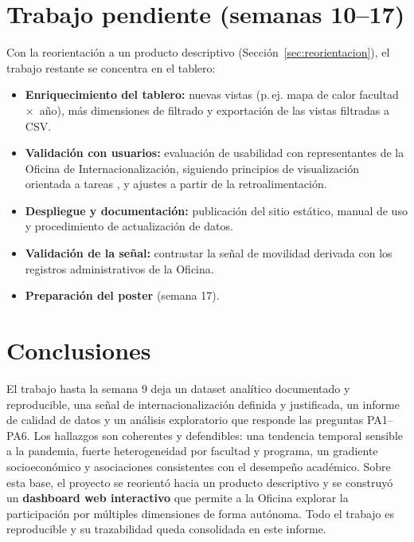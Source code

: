 \documentclass[12pt,a4paper]{article}
\begin{document}
\section{Trabajo pendiente (semanas 10--17)}
Con la reorientación a un producto descriptivo
(Sección~\ref{sec:reorientacion}), el trabajo restante se concentra en el tablero:

\begin{itemize}[leftmargin=*]
    \item \textbf{Enriquecimiento del tablero:} nuevas vistas (p.\,ej. mapa de
    calor facultad~$\times$~año), más dimensiones de filtrado y exportación de las
    vistas filtradas a CSV.
    \item \textbf{Validación con usuarios:} evaluación de usabilidad con
    representantes de la Oficina de Internacionalización, siguiendo principios de
    visualización orientada a tareas \cite{shneiderman1996,munzner2014}, y ajustes
    a partir de la retroalimentación.
    \item \textbf{Despliegue y documentación:} publicación del sitio estático,
    manual de uso y procedimiento de actualización de datos.
    \item \textbf{Validación de la señal:} contrastar la señal de movilidad
    derivada con los registros administrativos de la Oficina.
    \item \textbf{Preparación del poster} (semana 17).
\end{itemize}

\section{Conclusiones}
El trabajo hasta la semana 9 deja un dataset analítico documentado y reproducible,
una señal de internacionalización definida y justificada, un informe de calidad de
datos y un análisis exploratorio que responde las preguntas PA1--PA6. Los
hallazgos son coherentes y defendibles: una tendencia temporal sensible a la
pandemia, fuerte heterogeneidad por facultad y programa, un gradiente
socioeconómico y asociaciones consistentes con el desempeño académico. Sobre esta
base, el proyecto se reorientó hacia un producto descriptivo y se construyó un
\textbf{dashboard web interactivo} que permite a la Oficina explorar la
participación por múltiples dimensiones de forma autónoma. Todo el trabajo es
reproducible y su trazabilidad queda consolidada en este informe.
\end{document}
